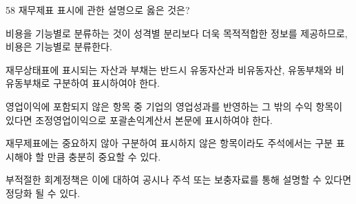 \begin{question}{58}
재무제표 표시에 관한 설명으로 옳은 것은?
\begin{choices}
  \item 비용을 기능별로 분류하는 것이 성격별 분리보다 더욱 목적적합한 정보를 제공하므로, 비용은 기능별로 분류한다.
  \item 재무상태표에 표시되는 자산과 부채는 반드시 유동자산과 비유동자산, 유동부채와 비유동부채로 구분하여 표시하여야 한다.
  \item 영업이익에 포함되지 않은 항목 중 기업의 영업성과를 반영하는 그 밖의 수익 항목이 있다면 조정영업이익으로 포괄손익계산서 본문에 표시하여야 한다.
  \item 재무제표에는 중요하지 않아 구분하여 표시하지 않은 항목이라도 주석에서는 구분 표시해야 할 만큼 충분히 중요할 수 있다.
  \item 부적절한 회계정책은 이에 대하여 공시나 주석 또는 보충자료를 통해 설명할 수 있다면 정당화 될 수 있다.
\end{choices}
\end{question}
